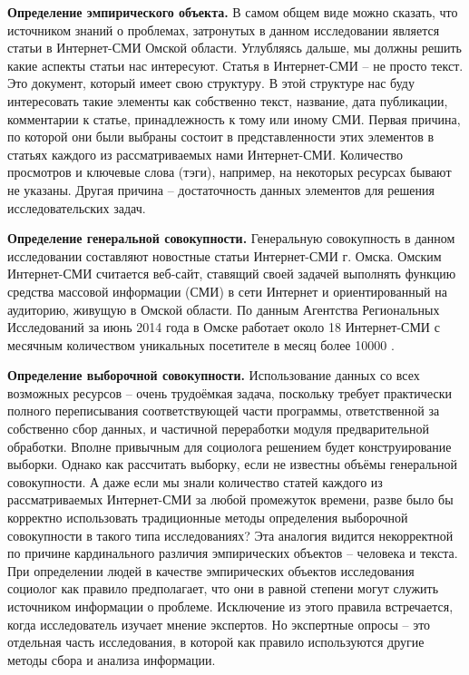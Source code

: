\textbf{Определение эмпирического объекта.} В самом общем виде можно сказать, что источником знаний о проблемах, затронутых в данном исследовании является статьи в Интернет-СМИ Омской области. Углубляясь дальше, мы должны решить какие аспекты статьи нас интересуют. Статья в Интернет-СМИ -- не просто текст. Это документ, который имеет свою структуру. В этой структуре нас буду интересовать такие элементы как собственно текст, название, дата публикации, комментарии к статье, принадлежность к тому или иному СМИ. Первая причина, по которой они были выбраны состоит в представленности этих элементов в статьях каждого из рассматриваемых нами Интернет-СМИ. Количество просмотров и ключевые слова (тэги), например, на некоторых ресурсах бывают не указаны. Другая причина -- достаточность данных элементов для решения исследовательских задач.

\textbf{Определение генеральной совокупности.} Генеральную совокупность в данном исследовании составляют новостные статьи Интернет-СМИ г. Омска. Омским Интернет-СМИ считается веб-сайт, ставящий своей задачей выполнять функцию средства массовой информации (СМИ) в сети Интернет и ориентированный на аудиторию, живущую в Омской области. По данным Агентства Региональных Исследований за июнь 2014 года в Омске работает около 18 Интернет-СМИ с месячным количеством уникальных посетителе в месяц более 10000 \cite{ari_rating}. 

\textbf{Определение выборочной совокупности.} Использование данных со всех возможных ресурсов -- очень трудоёмкая задача, поскольку требует практически полного переписывания соответствующей части программы, ответственной за собственно сбор данных, и частичной переработки модуля предварительной обработки. Вполне привычным для социолога решением будет конструирование выборки. Однако как рассчитать выборку, если не известны объёмы генеральной совокупности. А даже если мы знали количество статей каждого из рассматриваемых Интернет-СМИ за любой промежуток времени, разве было бы корректно использовать традиционные методы определения выборочной совокупности в такого типа исследованиях? Эта аналогия видится некорректной по причине кардинального различия эмпирических объектов -- человека и текста. При определении людей в качестве эмпирических объектов исследования социолог как правило предполагает, что они в равной степени могут служить источником информации о проблеме. Исключение из этого правила встречается, когда исследователь изучает мнение экспертов. Но экспертные опросы -- это отдельная часть исследования, в которой как правило используются другие методы сбора и анализа информации.

